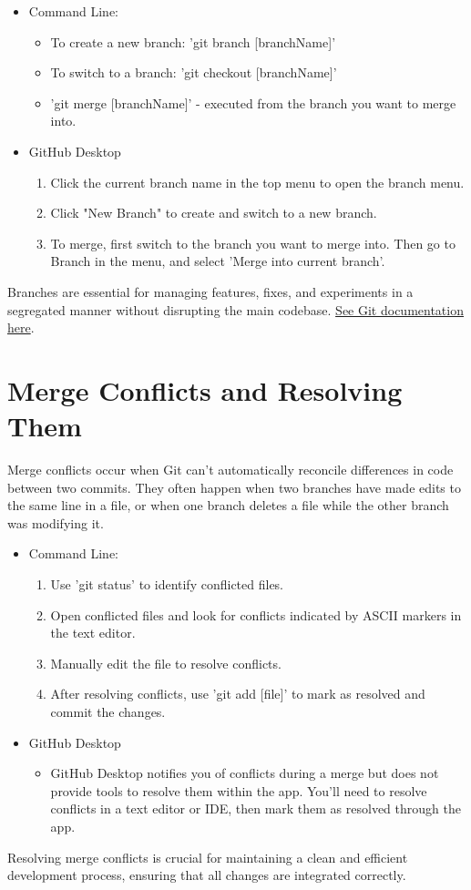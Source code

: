 \documentclass[10pt,twocolumn]{article}
\begin{document}
\begin{itemize}
    \item Command Line: 
    \begin{itemize}
        \item To create a new branch: 'git branch [branchName]'
        \item To switch to a branch: 'git checkout [branchName]'
        \item 'git merge [branchName]' - executed from the branch you want to merge into.
    \end{itemize}
    \item GitHub Desktop
    \begin{enumerate}
        \item Click the current branch name in the top menu to open the branch menu.
        \item Click "New Branch" to create and switch to a new branch.
        \item To merge, first switch to the branch you want to merge into. Then go to Branch in the menu, and select 'Merge into current branch'.
    \end{enumerate}
\end{itemize}
Branches are essential for managing features, fixes, and experiments in a segregated manner without disrupting the main codebase. \hyperlink{https://git-scm.com/docs/git-branch}{See Git documentation here}. \cite{GitBranchDocumentation}\cite{GitGuidesRemote}


\section{Merge Conflicts and Resolving Them}

Merge conflicts occur when Git can't automatically reconcile differences in code between two commits. They often happen when two branches have made edits to the same line in a file, or when one branch deletes a file while the other branch was modifying it.
\begin{itemize}
    \item Command Line: 
    \begin{enumerate}
        \item Use 'git status' to identify conflicted files.
        \item Open conflicted files and look for conflicts indicated by ASCII markers in the text editor.
        \item Manually edit the file to resolve conflicts.
        \item After resolving conflicts, use 'git add [file]' to mark as resolved and commit the changes.
    \end{enumerate}
    \item GitHub Desktop
    \begin{itemize}
        \item GitHub Desktop notifies you of conflicts during a merge but does not provide tools to resolve them within the app. You'll need to resolve conflicts in a text editor or IDE, then mark them as resolved through the app.
    \end{itemize}
    
\end{itemize}

Resolving merge conflicts is crucial for maintaining a clean and efficient development process, ensuring that all changes are integrated correctly.

\printbibliography
\end{document}
